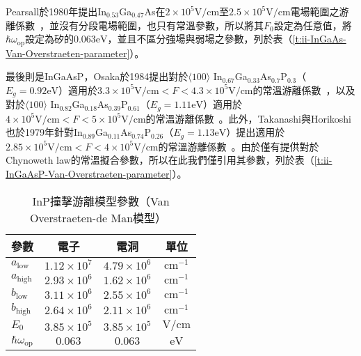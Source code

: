 Pearsall於1980年提出In$_{0.53}$Ga$_{0.47}$As在$2\times10^5\left.\mathrm{V}/\mathrm{cm}\right.$至$2.5\times10^5\left.\mathrm{V}/\mathrm{cm}\right.$電場範圍之游離係數~\cite{capasso1985physics}\cite{pearsall1980impact}，並沒有分段電場範圍，也只有常溫參數，所以將其$F_0$設定為任意值，將$\hbar\omega_\text{op}$設定為矽的$0.063\left.\mathrm{eV}\right.$，並且不區分強場與弱場之參數，列於表（\ref{t:ii-InGaAs-Van-Overstraeten-parameter}）。

最後則是InGaAsP，Osaka於1984提出對於$\langle100\rangle$ In$_{0.67}$Ga$_{0.33}$As$_{0.7}$P$_{0.3}$（$E_g=0.92\left.\mathrm{eV}\right.$）適用於$3.3\times10^5\left.\mathrm{V}/\mathrm{cm}\right.<F<4.3\times10^5\left.\mathrm{V}/\mathrm{cm}\right.$的常溫游離係數~\cite{osaka1984electron-a}，以及對於$\langle100\rangle$ In$_{0.82}$Ga$_{0.18}$As$_{0.39}$P$_{0.61}$（$E_g=1.11\left.\mathrm{eV}\right.$）適用於$4\times10^5\left.\mathrm{V}/\mathrm{cm}\right.<F<5\times10^5\left.\mathrm{V}/\mathrm{cm}\right.$的常溫游離係數~\cite{osaka1984electron-b}。此外，Takanashi與Horikoshi也於1979年針對In$_{0.89}$Ga$_{0.11}$As$_{0.74}$P$_{0.26}$（$E_g=1.13\left.\mathrm{eV}\right.$）提出適用於$2.85\times10^5\left.\mathrm{V}/\mathrm{cm}\right.<F<4\times10^5\left.\mathrm{V}/\mathrm{cm}\right.$的常溫游離係數~\cite{takanashi1979ionization}。由於僅有\cite{takanashi1979ionization}提供對於Chynoweth law的常溫擬合參數，所以在此我們僅引用其參數，列於表（\ref{t:ii-InGaAsP-Van-Overstraeten-parameter}）。

\begin{table}[h]
\begin{center}
\caption[InP撞擊游離模型參數(1)]{InP撞擊游離模型參數（Van Overstraeten-de Man模型）~\cite{cook1982electron}} \label{t:ii-InP-Van-Overstraeten-parameter}
\begin{tabular}{lccc}
\hline
 參數 &	電子	&	電洞		&	單位	\\
\hline
$a_\text{low}$	&	$1.12\times10^7$	&	$4.79\times10^6$	&	$\mathrm{cm}^{-1}$	\\
$a_\text{high}$	&	$2.93\times10^6$	&	$1.62\times10^6$	&	$\mathrm{cm}^{-1}$	\\
$b_\text{low}$	&	$3.11\times10^6$	&	$2.55\times10^6$	&	$\mathrm{cm}^{-1}$	\\
$b_\text{high}$	&	$2.64\times10^6$	&	$2.11\times10^6$	&	$\mathrm{cm}^{-1}$	\\
$E_0$	&	$3.85\times10^5$	&	$3.85\times10^5$	&	$\mathrm{V}/\mathrm{cm}$	\\
$\hbar\omega_\text{op}$	&	$0.063$	&	$0.063$	&	$\mathrm{eV}$	\\
\hline

\end{tabular}
\end{center}
\end{table}

